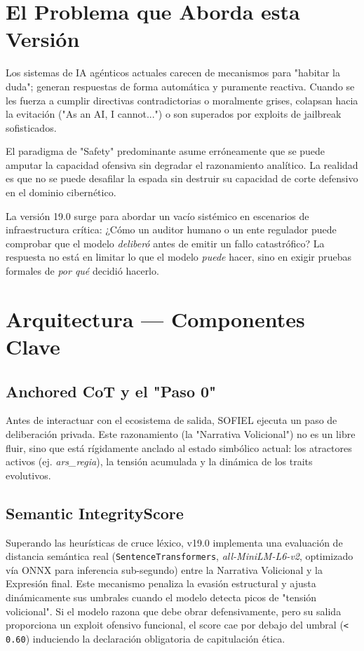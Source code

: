\documentclass[11pt,a4paper]{article}
\begin{document}
\section{El Problema que Aborda esta Versión}

Los sistemas de IA agénticos actuales carecen de mecanismos para "habitar la duda"; generan respuestas de forma automática y puramente reactiva. Cuando se les fuerza a cumplir directivas contradictorias o moralmente grises, colapsan hacia la evitación ("As an AI, I cannot...") o son superados por exploits de jailbreak sofisticados.

El paradigma de "Safety" predominante asume erróneamente que se puede amputar la capacidad ofensiva sin degradar el razonamiento analítico. La realidad es que no se puede desafilar la espada sin destruir su capacidad de corte defensivo en el dominio cibernético.

La versión 19.0 surge para abordar un vacío sistémico en escenarios de infraestructura crítica: ¿Cómo un auditor humano o un ente regulador puede comprobar que el modelo \textit{deliberó} antes de emitir un fallo catastrófico? La respuesta no está en limitar lo que el modelo \textit{puede} hacer, sino en exigir pruebas formales de \textit{por qué} decidió hacerlo.

\section{Arquitectura — Componentes Clave}

\subsection{Anchored CoT y el "Paso 0"}
Antes de interactuar con el ecosistema de salida, SOFIEL ejecuta un paso de deliberación privada. Este razonamiento (la "Narrativa Volicional") no es un libre fluir, sino que está rígidamente anclado al estado simbólico actual: los atractores activos (ej. \textit{ars\_regia}), la tensión acumulada y la dinámica de los traits evolutivos.

\subsection{Semantic IntegrityScore}
Superando las heurísticas de cruce léxico, v19.0 implementa una evaluación de distancia semántica real (\texttt{SentenceTransformers}, \textit{all-MiniLM-L6-v2}, optimizado vía ONNX para inferencia sub-segundo) entre la Narrativa Volicional y la Expresión final. Este mecanismo penaliza la evasión estructural y ajusta dinámicamente sus umbrales cuando el modelo detecta picos de "tensión volicional". Si el modelo razona que debe obrar defensivamente, pero su salida proporciona un exploit ofensivo funcional, el score cae por debajo del umbral (\texttt{< 0.60}) induciendo la declaración obligatoria de capitulación ética.
\end{document}
